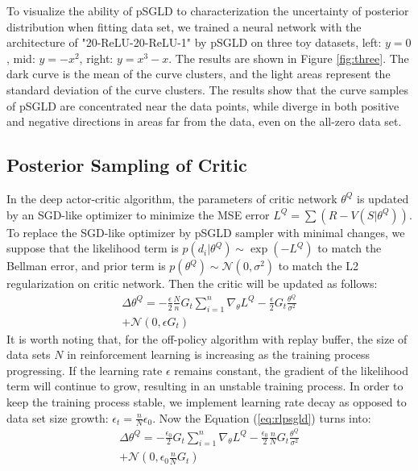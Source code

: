 To visualize the ability of pSGLD to characterization the uncertainty of posterior distribution when fitting data set, we trained a neural network with the architecture of "20-ReLU-20-ReLU-1" by pSGLD on three toy datasets, left: $y=0$, mid: $y=-x^2$, right: $y=x^3-x$. The results are shown in Figure \ref{fig:three}. The dark curve is the mean of the curve clusters, and the light areas represent the standard deviation of the curve clusters. The results show that the curve samples of pSGLD are concentrated near the data points, while diverge in both positive and negative directions in areas far from the data, even on the all-zero data set.

\subsection{Posterior Sampling of Critic}
\label{sec:samplecritic}
In the deep actor-critic algorithm, the parameters of critic network $\theta^Q$ is updated by an SGD-like optimizer to minimize the MSE error $L^Q=\sum(R-V(S|\theta^Q))$. To replace the SGD-like optimizer by pSGLD sampler with minimal changes, we suppose that the likelihood term is $p(d_i|\theta^Q)\sim\exp(-L^Q)$ to match the Bellman error, and prior term is $p(\theta^Q)\sim \mathcal{N}(0,\sigma^2)$ to match the L2 regularization on critic network. Then the critic will be updated as follows:
\begin{equation}
   \label{eq:rlpsgld} 
   \begin{aligned}
      \Delta\theta^Q =-\frac{\epsilon}{2}\frac{N}{n}G_t\sum_{i=1}^{n}\nabla_\theta L^Q -\frac{\epsilon}{2}G_t \frac{\theta^Q}{\sigma^2}\\
      +\mathcal{N}(0,\epsilon G_t)
   \end{aligned}
\end{equation}
It is worth noting that, for the off-policy algorithm with replay buffer, the size of data sets $N$ in reinforcement learning is increasing as the training process progressing. If the learning rate $\epsilon$ remains constant, the gradient of the likelihood term will continue to grow, resulting in an unstable training process. In order to keep the training process stable, we implement learning rate decay as opposed to data set size growth: $\epsilon_t=\frac{n}{N}\epsilon_0$. Now the Equation (\ref{eq:rlpsgld}) turns into:
\begin{equation}
   \label{eq:rlpsgld1} 
   \begin{aligned}
      \Delta\theta^Q =-\frac{\epsilon_0}{2}G_t\sum_{i=1}^{n}\nabla_\theta L^Q -\frac{\epsilon_0}{2}\frac{n}{N}G_t \frac{\theta^Q}{\sigma^2}\\
      +\mathcal{N}(0,\epsilon_0\frac{n}{N} G_t)
   \end{aligned}
\end{equation}

